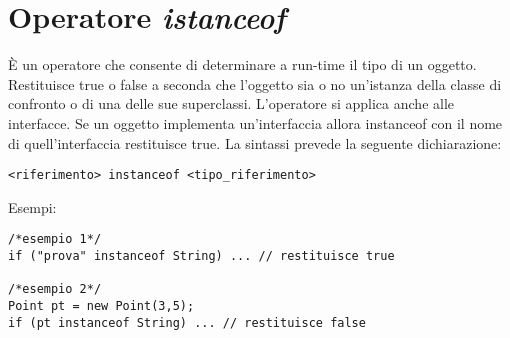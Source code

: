 \section{Operatore \textit{istanceof}}
È un operatore che consente di determinare a run-time il tipo di un oggetto. Restituisce true o false a seconda che l'oggetto sia o no un'istanza della classe di confronto o di una delle sue superclassi. L'operatore si applica anche alle interfacce. Se un oggetto implementa un'interfaccia allora instanceof con il nome di quell'interfaccia restituisce true. La sintassi prevede la seguente dichiarazione:
\begin{lstlisting}
<riferimento> instanceof <tipo_riferimento>
\end{lstlisting}
Esempi:
\begin{lstlisting}
/*esempio 1*/
if ("prova" instanceof String) ... // restituisce true 

/*esempio 2*/
Point pt = new Point(3,5); 
if (pt instanceof String) ... // restituisce false 
\end{lstlisting}